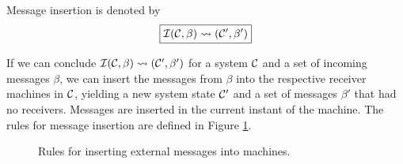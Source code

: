 Message insertion is denoted by
\begin{equation*}
\boxed{\mathcal{I}(\mathcal{C}, \beta) \leadsto (\mathcal{C}', \beta')}
\end{equation*}

If we can conclude $\mathcal{I}(\mathcal{C}, \beta) \leadsto (\mathcal{C}', \beta')$ for a system $\mathcal{C}$ and
a set of incoming messages $\beta$, we can insert the messages from $\beta$
into the respective receiver machines in $\mathcal{C}$, yielding a new system state
$\mathcal{C}'$ and a set of messages $\beta'$ that had no receivers. Messages are
inserted in the current instant of the machine. The rules for message insertion
are defined in Figure \ref{fig:rule:insert}.

\begin{figure}[!h]
\caption{Rules for inserting external messages into machines.}\label{fig:rule:insert}
\end{figure}

